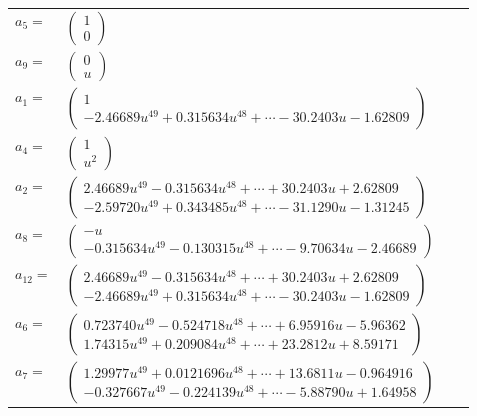 \documentclass[1p]{elsarticle_modified}
\theoremstyle{definition}
\begin{document}
\begin{tabular}{m{7pt} m{180pt} m{7pt} m{180pt} }
\flushright $a_{5}=$&$\begin{pmatrix}1\\0\end{pmatrix}$ \\
\flushright $a_{9}=$&$\begin{pmatrix}0\\u\end{pmatrix}$ \\
\flushright $a_{1}=$&$\begin{pmatrix}1\\-2.46689 u^{49}+0.315634 u^{48}+\cdots-30.2403 u-1.62809\end{pmatrix}$ \\
\flushright $a_{4}=$&$\begin{pmatrix}1\\u^2\end{pmatrix}$ \\
\flushright $a_{2}=$&$\begin{pmatrix}2.46689 u^{49}-0.315634 u^{48}+\cdots+30.2403 u+2.62809\\-2.59720 u^{49}+0.343485 u^{48}+\cdots-31.1290 u-1.31245\end{pmatrix}$ \\
\flushright $a_{8}=$&$\begin{pmatrix}- u\\-0.315634 u^{49}-0.130315 u^{48}+\cdots-9.70634 u-2.46689\end{pmatrix}$ \\
\flushright $a_{12}=$&$\begin{pmatrix}2.46689 u^{49}-0.315634 u^{48}+\cdots+30.2403 u+2.62809\\-2.46689 u^{49}+0.315634 u^{48}+\cdots-30.2403 u-1.62809\end{pmatrix}$ \\
\flushright $a_{6}=$&$\begin{pmatrix}0.723740 u^{49}-0.524718 u^{48}+\cdots+6.95916 u-5.96362\\1.74315 u^{49}+0.209084 u^{48}+\cdots+23.2812 u+8.59171\end{pmatrix}$ \\
\flushright $a_{7}=$&$\begin{pmatrix}1.29977 u^{49}+0.0121696 u^{48}+\cdots+13.6811 u-0.964916\\-0.327667 u^{49}-0.224139 u^{48}+\cdots-5.88790 u+1.64958\end{pmatrix}$ \\

\end{tabular}
\end{document}
